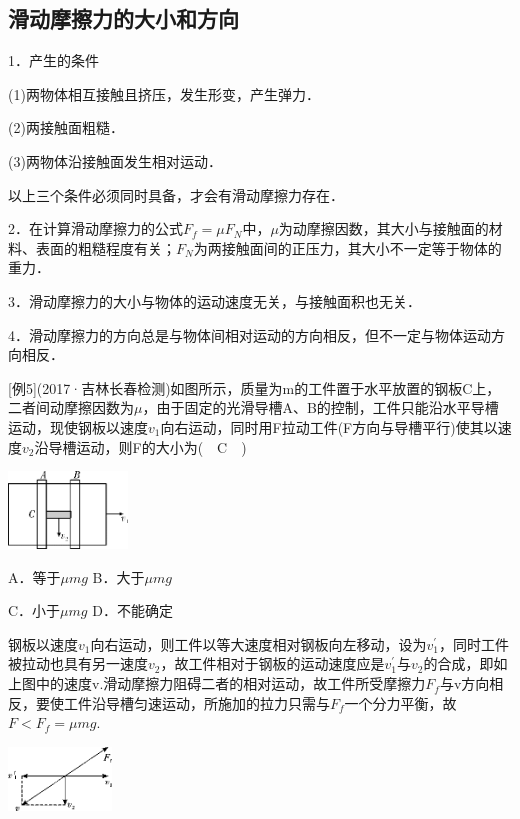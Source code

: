 \subsection{滑动摩擦力的大小和方向}

1．产生的条件

(1)两物体相互接触且挤压，发生形变，产生弹力．

(2)两接触面粗糙．

(3)两物体沿接触面发生相对运动．

以上三个条件必须同时具备，才会有滑动摩擦力存在．

2．在计算滑动摩擦力的公式$F_f=\mu F_N$中，$\mu$为动摩擦因数，其大小与接触面的材料、表面的粗糙程度有关；$F_N$为两接触面间的正压力，其大小不一定等于物体的重力．

3．滑动摩擦力的大小与物体的运动速度无关，与接触面积也无关．

4．滑动摩擦力的方向总是与物体间相对运动的方向相反，但不一定与物体运动方向相反．

{[}例5{]}(2017·吉林长春检测)如图所示，质量为m的工件置于水平放置的钢板C上，二者间动摩擦因数为$\mu$，由于固定的光滑导槽A、B的控制，工件只能沿水平导槽运动，现使钢板以速度$v_1$向右运动，同时用F拉动工件(F方向与导槽平行)使其以速度$v_2$沿导槽运动，则F的大小为(　C　)

\begin{center}\includegraphics[width=1.25in,height=0.8125in]{media/image50.png}\end{center}

A．等于$\mu mg$ B．大于$\mu mg$

C．小于$\mu mg$ D．不能确定
\begin{solution}
	钢板以速度$v_1$向右运动，则工件以等大速度相对钢板向左移动，设为$v_1^{'}$，同时工件被拉动也具有另一速度$v_2$，故工件相对于钢板的运动速度应是$v_1^{'}$与$v_2$的合成，即如上图中的速度v.滑动摩擦力阻碍二者的相对运动，故工件所受摩擦力$F_f$与v方向相反，要使工件沿导槽匀速运动，所施加的拉力只需与$F_f$一个分力平衡，故 $F< F_f=\mu mg$.
\end{solution}

\begin{center}\includegraphics[width=1.08333in,height=0.66667in]{media/image51.png}\end{center}
\newpage
